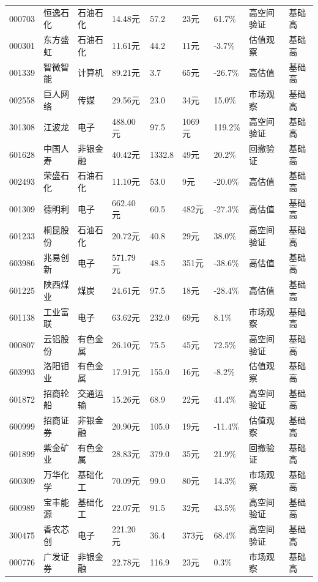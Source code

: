 \begin{longtable}{L{1.0cm}L{1.55cm}L{1.4cm}R{1.0cm}R{1.0cm}R{1.0cm}R{1.05cm}L{3.6cm}L{0.9cm}}
000703 & 恒逸石化 & 石油石化 & 14.48元 & 57.2 & 23元 & 61.7\% & 高空间验证 & 基础高 \\
000301 & 东方盛虹 & 石油石化 & 11.61元 & 44.2 & 11元 & -3.7\% & 估值观察 & 基础高 \\
001339 & 智微智能 & 计算机 & 89.21元 & 3.7 & 65元 & -26.7\% & 高估值 & 基础高 \\
002558 & 巨人网络 & 传媒 & 29.56元 & 23.0 & 34元 & 15.0\% & 市场观察 & 基础高 \\
301308 & 江波龙 & 电子 & 488.00元 & 97.5 & 1069元 & 119.2\% & 高空间验证 & 基础高 \\
601628 & 中国人寿 & 非银金融 & 40.42元 & 1332.8 & 49元 & 20.2\% & 回撤验证 & 基础高 \\
002493 & 荣盛石化 & 石油石化 & 11.10元 & 53.0 & 9元 & -20.0\% & 高估值 & 基础高 \\
001309 & 德明利 & 电子 & 662.40元 & 60.5 & 482元 & -27.3\% & 高估值 & 基础高 \\
601233 & 桐昆股份 & 石油石化 & 20.72元 & 40.8 & 29元 & 38.0\% & 高空间验证 & 基础高 \\
603986 & 兆易创新 & 电子 & 571.79元 & 48.5 & 351元 & -38.6\% & 高估值 & 基础高 \\
601225 & 陕西煤业 & 煤炭 & 24.61元 & 97.5 & 18元 & -28.4\% & 高估值 & 基础高 \\
601138 & 工业富联 & 电子 & 63.62元 & 232.0 & 69元 & 8.1\% & 市场观察 & 基础高 \\
000807 & 云铝股份 & 有色金属 & 26.10元 & 75.5 & 45元 & 72.5\% & 高空间验证 & 基础高 \\
603993 & 洛阳钼业 & 有色金属 & 17.91元 & 155.0 & 16元 & -8.2\% & 估值观察 & 基础高 \\
601872 & 招商轮船 & 交通运输 & 15.26元 & 68.9 & 22元 & 41.4\% & 高空间验证 & 基础高 \\
600999 & 招商证券 & 非银金融 & 20.90元 & 105.0 & 19元 & -11.4\% & 估值观察 & 基础高 \\
601899 & 紫金矿业 & 有色金属 & 28.83元 & 379.0 & 35元 & 21.9\% & 回撤验证 & 基础高 \\
600309 & 万华化学 & 基础化工 & 70.09元 & 99.0 & 80元 & 14.3\% & 市场观察 & 基础高 \\
600989 & 宝丰能源 & 基础化工 & 22.07元 & 91.5 & 32元 & 43.5\% & 高空间验证 & 基础高 \\
300475 & 香农芯创 & 电子 & 221.20元 & 36.4 & 373元 & 68.4\% & 高空间验证 & 基础高 \\
000776 & 广发证券 & 非银金融 & 22.78元 & 116.9 & 23元 & 0.3\% & 市场观察 & 基础高 \\

\end{longtable}

